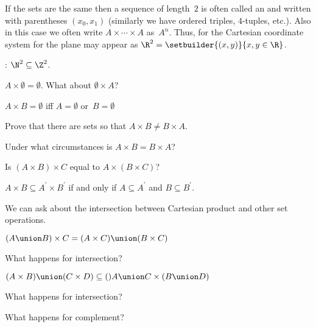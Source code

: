 \documentclass{ibl}
\begin{document}
If the sets are the same then 
a sequence of length~$2$ is often called an  and 
written with parentheses $(x_0,x_1)$
(similarly we have ordered triples, $4$-tuples, etc.).
Also in this case we often write $A\times\cdots\times A$ 
as~$A^n$.
Thus, for the Cartesian coordinate system for the plane may appear as
$\R^2=\setbuilder{(x,y)}{x,y\in\R}$.

\begin{ex}
\pord:  $\N^2\subseteq \Z^2$.  
\end{ex}

\begin{ex}
\begin{exes}
\item $A\times \emptyset=\emptyset$.
  What about $\emptyset\times A$?
\item $A\times B=\emptyset$ iff $A=\emptyset$ or~$B=\emptyset$
\item Prove that there are sets so that $A\times B\neq B\times A$.
\item Under what circumstances is $A\times B=B\times A$?
\item Is $(A\times B)\times C$ equal to $A\times (B\times C)$?
\item $A\times B\subseteq A^\prime\times B^\prime$ if and only if
  $A\subseteq A^\prime$ and $B\subseteq B^\prime$.
\end{exes}
\end{ex}

\begin{ex} We can ask about the intersection between Cartesian product and 
other set operations.
\begin{exes}
\item $(A\union B)\times C=(A\times C)\union(B\times C)$
\item What happens for intersection?
\item $(A\times B)\union (C\times D)\subseteq ()A\union C\times (B\union D)$
\item What happens for intersection?
\item What happens for complement?
\end{exes}
\end{ex}








\end{document}
